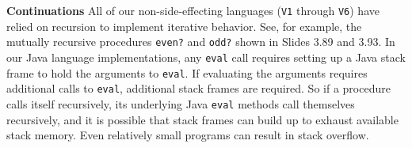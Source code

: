 \begin{minipage}[t]{\sw}
\slidenumber
\LARGE
{\bf Continuations}\exx
All of our non-side-effecting languages (\verb'V1' through \verb'V6')
have relied on recursion to implement iterative behavior.
See, for example, the mutually recursive procedures
\verb'even?' and \verb'odd?' shown in Slides 3.89 and 3.93.
In our Java language implementations,
any \verb'eval' call requires setting up a Java stack frame
to hold the arguments to \verb'eval'.
If evaluating the arguments requires additional calls to \verb'eval',
additional stack frames are required.
So if a procedure calls itself recursively,
its underlying Java \verb'eval' methods call themselves recursively, 
and it is possible that stack frames can build up
to exhaust available stack memory.
Even relatively small programs can result in stack overflow.\exx
\end{minipage}
